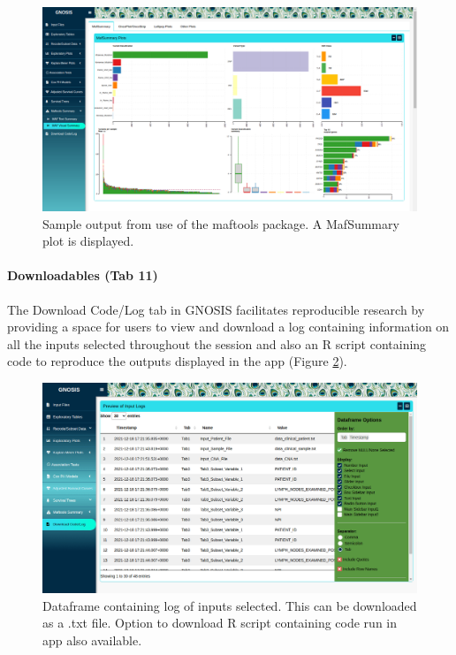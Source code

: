 \begin{figure}[!h]
\center
\includegraphics[width=1\textwidth]{../figures/Chapter_3/GNOSIS_Fig10.png}
\caption[Sample output from use of the maftools package.]{Sample output from use of the maftools package. A MafSummary plot is displayed.}
\label{fig:MAFvis}
\end{figure}

\paragraph{Downloadables (Tab 11)}
\hfill

\noindent The Download Code/Log tab in GNOSIS facilitates reproducible research by providing a space for users to view and download a log containing information on all the inputs selected throughout the session and also an R script containing code to reproduce the outputs displayed in the app (Figure \ref{fig:down}). 

\begin{figure}[!h]
\center
\includegraphics[width=1\textwidth]{../figures/Chapter_3/GNOSIS_Fig11.png}
\caption[Dataframe containing log of inputs selected.]{Dataframe containing log of inputs selected. This can be downloaded as a .txt file. Option to download R script containing code run in app also available.}
\label{fig:down}
\end{figure}


